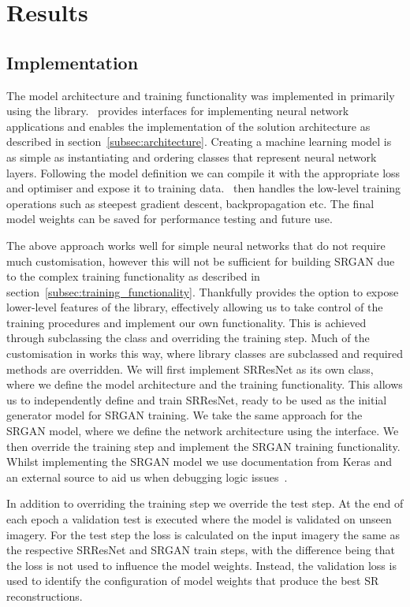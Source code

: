 \chapter{Results}
\label{chapter3}

\section{Implementation}
The model architecture and training functionality was implemented in  primarily using the  library.\  provides interfaces for implementing neural network applications and enables the implementation of the solution architecture as described in section~\ref{subsec:architecture}. Creating a machine learning model is as simple as instantiating and ordering  classes that represent neural network layers. Following the model definition we can compile it with the appropriate loss and optimiser and expose it to training data.\  then handles the low-level training operations such as steepest gradient descent, backpropagation etc. The final model weights can be saved for performance testing and future use.

The above approach works well for simple neural networks that do not require much customisation, however this will not be sufficient for building SRGAN due to the complex training functionality as described in section~\ref{subsec:training_functionality}. Thankfully  provides the option to expose lower-level features of the library, effectively allowing us to take control of the training procedures and implement our own functionality. This is achieved through subclassing the  class and overriding the training step. Much of the customisation in  works this way, where library classes are subclassed and required methods are overridden. We will first implement SRResNet as its own class, where we define the model architecture and the training functionality. This allows us to independently define and train SRResNet, ready to be used as the initial generator model for SRGAN training. We take the same approach for the SRGAN model, where we define the network architecture using the  interface. We then override the training step and implement the SRGAN training functionality. Whilst implementing the SRGAN model we use documentation from Keras and an external source to aid us when debugging logic issues~\cite{keras, srganImplementation}.

In addition to overriding the training step we override the test step. At the end of each epoch a validation test is executed where the model is validated on unseen imagery. For the test step the loss is calculated on the input imagery the same as the respective SRResNet and SRGAN train steps, with the difference being that the loss is not used to influence the model weights. Instead, the validation loss is used to identify the configuration of model weights that produce the best SR reconstructions.

